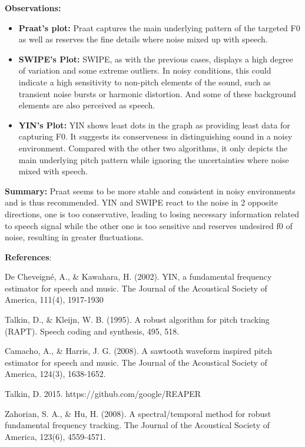 \documentclass{../labbook}
\begin{document}
\begin{solution}
\begin{figure}[h]
\end{figure}

\textbf{Observations:}
\begin{itemize}
    \item \textbf{Praat's plot:} Praat captures the main underlying pattern of the targeted F0 as well as reserves the fine details where noise mixed up with speech. 




    \item \textbf{SWIPE's Plot:} SWIPE, as with the previous cases, displays a high degree of variation and some extreme outliers. In noisy conditions, this could indicate a high sensitivity to non-pitch elements of the sound, such as transient noise bursts or harmonic distortion. And some of these background elements are also perceived as speech. 



    \item \textbf{YIN's Plot:} YIN shows least dots in the graph as providing least data for  capturing F0. It suggests its conserveness in distinguishing sound in a noisy environment. Compared with the other two algorithms, it only depicts the main underlying pitch pattern while ignoring the uncertainties where noise mixed with speech. 



\end{itemize}

\textbf{Summary:} Praat seems to be more stable and consistent in noisy environments and is thus recommended. YIN and SWIPE react to the noise in 2 opposite directions, one is too conservative, leading to losing necessary information related to speech signal while the other one is too sensitive and reserves undesired f0 of noise, resulting in greater fluctuations.

\end{solution}

\bigskip
\textbf{References}:

\noindent De Cheveign\'e, A., \& Kawahara, H. (2002). YIN, a fundamental frequency estimator for speech and music. The Journal of the Acoustical Society of America, 111(4), 1917-1930

Talkin, D., \& Kleijn, W. B. (1995). A robust algorithm for pitch tracking (RAPT). Speech coding and synthesis, 495, 518.

Camacho, A., \& Harris, J. G. (2008). A sawtooth waveform inspired pitch estimator for speech and music. The Journal of the Acoustical Society of America, 124(3), 1638-1652.

Talkin, D. 2015. https://github.com/google/REAPER

Zahorian, S. A., \& Hu, H. (2008). A spectral/temporal method for robust fundamental frequency tracking. The Journal of the Acoustical Society of America, 123(6), 4559-4571.
\end{document}
